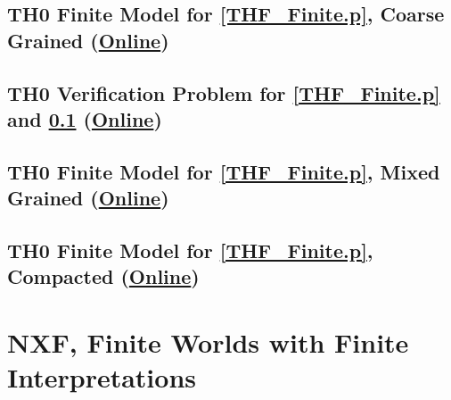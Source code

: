 \documentclass{easychair}
\begin{document}
\newpage
\subsection{TH0 Finite Model for \ref{THF_Finite.p}, Coarse Grained
(\href{https://raw.githubusercontent.com/GeoffsPapers/InterpretationFormat/master/Examples/THF_Finite.s}{Online})}
\label{THF_Finite.s}
\begin{small}

\end{small}

\newpage
\subsection{TH0 Verification Problem for \ref{THF_Finite.p} and \ref{THF_Finite.s}
(\href{https://raw.githubusercontent.com/GeoffsPapers/InterpretationFormat/master/Examples/THF_Finite.s.p}{Online})}
\label{THF_Finite.s.p}
\begin{small}

\end{small}

\newpage
\subsection{TH0 Finite Model for \ref{THF_Finite.p}, Mixed Grained
(\href{https://raw.githubusercontent.com/GeoffsPapers/InterpretationFormat/master/Examples/THF_Finite_Medium.s}{Online})}
\label{THF_Finite_Medium.s}
\begin{small}

\end{small}

\newpage
\subsection{TH0 Finite Model for \ref{THF_Finite.p}, Compacted
(\href{https://raw.githubusercontent.com/GeoffsPapers/InterpretationFormat/master/Examples/THF_Finite_Compact.s}{Online})}
\label{THF_Finite_Compact.s}
\begin{small}

\end{small}

\newpage
\section{NXF, Finite Worlds with Finite Interpretations}
\label{NXF}
\end{document}
